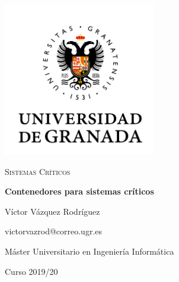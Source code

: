 \documentclass{article}
\begin{document}
\begin{titlepage}
    \centering
    \includegraphics[width=0.5\textwidth]{images/logo-ugr.png}\par
    \vspace{1cm}
    {\Large\scshape Sistemas Críticos \par}
    {\huge\bfseries Contenedores para sistemas críticos \par}
    \vspace{0.2cm}
    \vfill
    {\large Víctor Vázquez Rodríguez  \par}
    {victorvazrod@correo.ugr.es \par}
    \vfill
    {\large Máster Universitario en Ingeniería Informática \par}
    \vspace{0.2cm}
    {Curso 2019/20 \par}
\end{titlepage}

\tableofcontents\newpage

\newpage
\newpage
\newpage
\newpage
\end{document}
